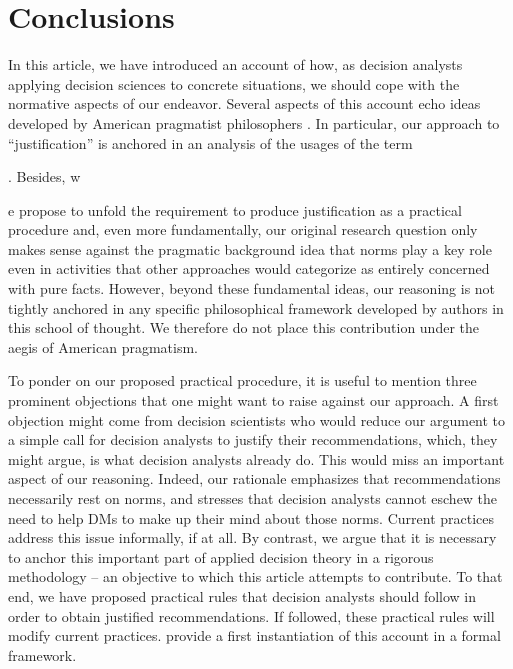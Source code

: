 \documentclass[preprint, french, english, 11pt, authoryear]{elsarticle}%
\begin{document}
\section{Conclusions}
\label{sec:concl}
In this article, we have introduced an account of how, as decision analysts applying decision sciences to concrete situations, we should cope with the normative aspects of our endeavor. %
Several aspects of this account echo ideas developed by American pragmatist philosophers \citep{ormerod_history_2006}. 
In particular, our approach to ``justification'' is anchored in an analysis of the usages of the term\begin{changebar}. Besides, w\end{changebar}e propose to unfold the requirement to produce justification as a practical procedure and, even more fundamentally, 
our original research question only makes sense against the pragmatic background idea that norms play a key role even in activities that other approaches would categorize as entirely concerned with pure facts.
However, beyond these fundamental ideas, our reasoning is not tightly anchored in any specific philosophical framework developed by authors in this school of thought.
We therefore do not place this contribution under the aegis of American pragmatism.


To ponder on our proposed practical procedure, it is useful to mention three prominent objections that one might want to raise against our approach. A first objection might come from decision scientists who would reduce our argument to a simple call for decision analysts to justify their recommendations, which, they might argue, is what decision analysts already do. This would miss an important aspect of our reasoning. Indeed, our rationale emphasizes that recommendations necessarily rest on norms, and stresses that decision analysts cannot eschew the need to help \acp{DM} to make up their mind about those norms. Current practices address this issue informally, if at all. By contrast, we argue that it is necessary to anchor this important part of applied decision theory in a rigorous methodology -- an objective to which this article attempts to contribute. To that end, we have proposed practical rules that decision analysts should follow in order to obtain justified recommendations. If followed, these practical rules will modify current practices. \citet{cailloux_formal_2018} provide a first instantiation of this account in a formal framework.
\end{document}
